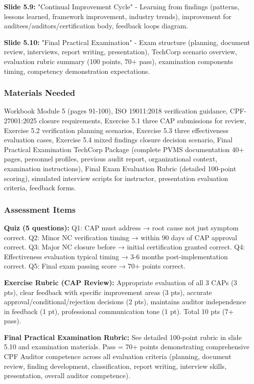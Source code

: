 \documentclass[11pt,a4paper]{article}
\begin{document}
\textbf{Slide 5.9:} "Continual Improvement Cycle" - Learning from findings (patterns, lessons learned, framework improvement, industry trends), improvement for auditees/auditors/certification body, feedback loops diagram.

\textbf{Slide 5.10:} "Final Practical Examination" - Exam structure (planning, document review, interviews, report writing, presentation), TechCorp scenario overview, evaluation rubric summary (100 points, 70+ pass), examination components timing, competency demonstration expectations.

\subsubsection{Materials Needed}
Workbook Module 5 (pages 91-100), ISO 19011:2018 verification guidance, CPF-27001:2025 closure requirements, Exercise 5.1 three CAP submissions for review, Exercise 5.2 verification planning scenarios, Exercise 5.3 three effectiveness evaluation cases, Exercise 5.4 mixed findings closure decision scenario, Final Practical Examination TechCorp Package (complete PVMS documentation 40+ pages, personnel profiles, previous audit report, organizational context, examination instructions), Final Exam Evaluation Rubric (detailed 100-point scoring), simulated interview scripts for instructor, presentation evaluation criteria, feedback forms.

\subsubsection{Assessment Items}
\textbf{Quiz (5 questions):} Q1: CAP must address → root cause not just symptom correct. Q2: Minor NC verification timing → within 90 days of CAP approval correct. Q3: Major NC closure before → initial certification granted correct. Q4: Effectiveness evaluation typical timing → 3-6 months post-implementation correct. Q5: Final exam passing score → 70+ points correct.

\textbf{Exercise Rubric (CAP Review):} Appropriate evaluation of all 3 CAPs (3 pts), clear feedback with specific improvement areas (3 pts), accurate approval/conditional/rejection decisions (2 pts), maintains auditor independence in feedback (1 pt), professional communication tone (1 pt). Total 10 pts (7+ pass).

\textbf{Final Practical Examination Rubric:} See detailed 100-point rubric in slide 5.10 and examination materials. Pass = 70+ points demonstrating comprehensive CPF Auditor competence across all evaluation criteria (planning, document review, finding development, classification, report writing, interview skills, presentation, overall auditor competence).
\end{document}
